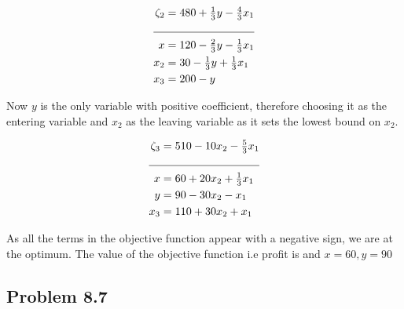 \documentclass[letterpaper,12pt]{article}
\theoremstyle{definition}
\begin{document}
\begin{align*}
  \zeta_2 &= 480 + \tfrac{1}{3}y -\tfrac{4}{3}x_1\\
  \cline{1-2}
  x &= 120 -\tfrac{2}{3}y - \tfrac{1}{3}x_1\\
  x_2&= 30-\tfrac{1}{3}y+\tfrac{1}{3}x_1\\
  x_3 &= 200-y \\
\end{align*}

Now $y$ is the only variable with positive coefficient, therefore choosing it as the entering variable and $x_2$ as the leaving variable as it sets the lowest bound on $x_2$.

\begin{align*}
  \zeta_3 &= 510 -10x_2 - \tfrac{5}{3}x_1\\
  \cline{1-2}
  x &= 60 + 20x_2+\tfrac{1}{3}x_1\\
  y &= 90 - 30x_2-x_1\\
  x_3 &= 110+30x_2+x_1 \\
\end{align*}

\begin{flushleft}
As all the terms in the objective function appear with a negative sign, we are at the optimum.
The value of the objective function i.e profit is  and $x=60, y=90$
\end{flushleft}

\subsection*{Problem 8.7 }
\end{document}
